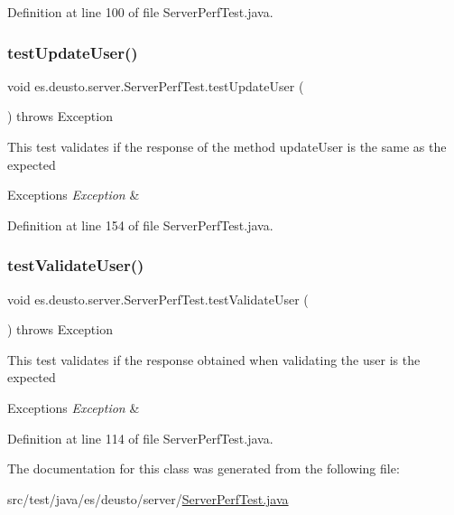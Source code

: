 Definition at line 100 of file Server\+Perf\+Test.\+java.

\mbox{\label{classes_1_1deusto_1_1server_1_1_server_perf_test_aeb4e8f76604acdd98213dec2e1f390d6}} 
\subsubsection{\texorpdfstring{test\+Update\+User()}{testUpdateUser()}}
{\footnotesize\ttfamily void es.\+deusto.\+server.\+Server\+Perf\+Test.\+test\+Update\+User (\begin{DoxyParamCaption}{ }\end{DoxyParamCaption}) throws Exception}

This test validates if the response of the method update\+User is the same as the expected 
\begin{DoxyExceptions}{Exceptions}
{\em Exception} & \\
\hline
\end{DoxyExceptions}


Definition at line 154 of file Server\+Perf\+Test.\+java.

\mbox{\label{classes_1_1deusto_1_1server_1_1_server_perf_test_a9006eeebc72b0f5aa9ee129d11a28b42}} 
\subsubsection{\texorpdfstring{test\+Validate\+User()}{testValidateUser()}}
{\footnotesize\ttfamily void es.\+deusto.\+server.\+Server\+Perf\+Test.\+test\+Validate\+User (\begin{DoxyParamCaption}{ }\end{DoxyParamCaption}) throws Exception}

This test validates if the response obtained when validating the user is the expected 
\begin{DoxyExceptions}{Exceptions}
{\em Exception} & \\
\hline
\end{DoxyExceptions}


Definition at line 114 of file Server\+Perf\+Test.\+java.



The documentation for this class was generated from the following file\+:\begin{DoxyCompactItemize}
\item 
src/test/java/es/deusto/server/\hyperlink{_server_perf_test_8java}{Server\+Perf\+Test.\+java}\end{DoxyCompactItemize}
